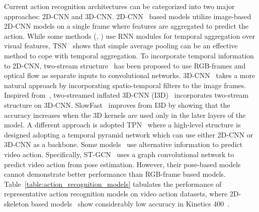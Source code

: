 \documentclass[10pt,twocolumn,letterpaper]{article}
\begin{document}
Current action recognition architectures can be categorized into two major approaches: 2D-CNN and 3D-CNN. 2D-CNN~\cite{LRCN,feichtenhofer2016convolutional,TSM,DBLP:conf/nips/SimonyanZ14,TSN,TRN} based models utilize image-based 2D-CNN models on a single frame where features are aggregated to predict the action. While some methods (\eg, \cite{LRCN}) use RNN modules for temporal aggregation over visual features, TSN~\cite{TSN} shows that simple average pooling can be an effective method to cope with temporal aggregation. To incorporate temporal information to 2D-CNN, two-stream structure~\cite{feichtenhofer2016convolutional,DBLP:conf/nips/SimonyanZ14} has been proposed to use RGB-frames and optical flow as separate inputs to convolutional networks.
3D-CNN~\cite{i3d,slowfast,stm} takes a more natural approach by incorporating spatio-temporal filters to the image frames. Inspired from~\cite{DBLP:conf/nips/SimonyanZ14}, two-streamed inflated 3D-CNN (I3D)~\cite{i3d} incorporates two-stream structure on 3D-CNN. SlowFast~\cite{slowfast} improves from I3D by showing that the accuracy increases when the 3D kernels are used only in the later layers of the model. A different approach is adopted TPN~\cite{TPN} where a high-level structure is designed adopting a temporal pyramid network which can use either 2D-CNN or 3D-CNN as a backbone. Some models~\cite{ke2017new,kim2017interpretable,stgcn} use alternative information to predict video action. Specifically, ST-GCN~\cite{stgcn} uses a graph convolutional network to predict video action from pose estimation. However, their pose-based models cannot demonstrate better performance than RGB-frame based models. Table~\ref{table:action_recognition_models} tabulates the performance of representative action recognition models on video action datasets, where 2D-skeleton based models~\cite{nturgbd,stgcn} show considerably low accuracy in Kinetics 400~\cite{kinetics400}.
  
\end{document}
